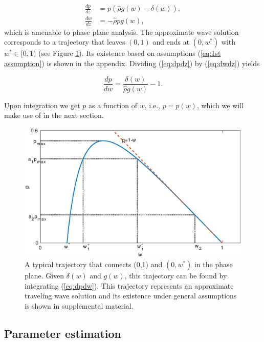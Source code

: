 \documentclass{aims}
\numberwithin{equation}{section}
\begin{document}
\begin{subequations}\label{eq:pp system}
\begin{align}
\frac{dp}{dz} & =p(\hat{\rho}g(w)-\delta(w)),\label{eq:dpdz}\\
\frac{dw}{dz} & =-\hat{\rho}pg(w),\label{eq:dwdz}
\end{align}
\end{subequations}which is amenable to phase plane analysis. The
approximate wave solution corresponds to a trajectory that leaves
$(0,1)$ and ends at $(0,w^{*})$ with $w^{*}\in[0,1)$ (see Figure
\ref{fig:pp}). Its existence based on assumptions (\ref{eq:1st assumption})
is shown in the appendix. Dividing (\ref{eq:dpdz}) by (\ref{eq:dwdz}) yields 

\begin{equation} \label{eq:dpdw}
\frac{dp}{dw}=\frac{\delta(w)}{\hat{\rho}g(w)}-1.
\end{equation}

 Upon integration we get $p$ as a function of $w$, i.e., $p=p(w)$,
which we will make use of in the next section. 

\begin{figure}
\begin{center}
\includegraphics[scale=0.65]{plots/pp.eps}\caption{\label{fig:pp}A typical trajectory that connects (0,1) and $(0,w^*)$ in the phase plane. Given $\delta(w)$ and $g(w)$, this trajectory can be found by integrating (\ref{eq:dpdw}). This trajectory represents an approximate traveling wave solution and its existence under general assumptions is shown in supplemental material.}
\end{center}
\end{figure}

\subsection{Parameter estimation}
\end{document}
